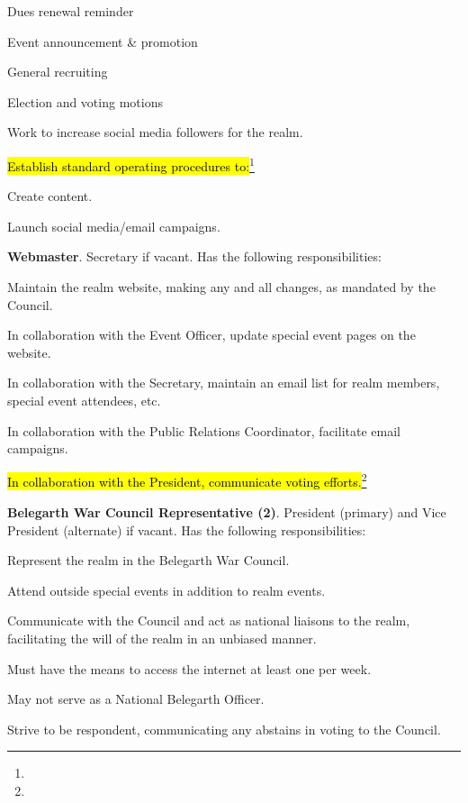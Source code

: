 \documentclass[12pt]{article}
\newcommand{\newpart}[2][]{\hl{#2}\expandafter\ifx\expandafter\relax\detokenize{#1}\relax\else\textnormal{\footnote{#1}}\fi}
\begin{document}
\begin{level}
\begin{level}
\begin{level}
        \begin{level}
            \item Dues renewal reminder
            \item Event announcement \& promotion
            \item General recruiting
            \item Election and voting motions
        \end{level}
        \item Work to increase social media followers for the realm.
        \item \newpart{Establish standard operating procedures to:}
        \begin{level}
            \item Create content.
            \item Launch social media/email campaigns.
        \end{level}
    \end{level}
    \item \textbf{Webmaster}. Secretary if vacant. Has the following responsibilities:
    \begin{level}
        \item Maintain the realm website, making any and all changes, as mandated by the Council.
        \item In collaboration with the Event Officer, update special event pages on the website.
        \item In collaboration with the Secretary, maintain an email list for realm members, special event attendees, etc.
        \item In collaboration with the Public Relations Coordinator, facilitate email campaigns.
        \item \newpart{In collaboration with the President, communicate voting efforts.}
    \end{level}
    \item \textbf{Belegarth War Council Representative (2)}. President (primary) and Vice President (alternate) if vacant. Has the following responsibilities:
    \begin{level}
        \item Represent the realm in the Belegarth War Council.
        \item Attend outside special events in addition to realm events.
        \item Communicate with the Council and act as national liaisons to the realm, facilitating the will of the realm in an unbiased manner.
        \item Must have the means to access the internet at least one per week.
        \item May not serve as a National Belegarth Officer.
        \item Strive to be respondent, communicating any abstains in voting to the Council.
    \end{level}
\end{level}

\end{level}
\end{document}
